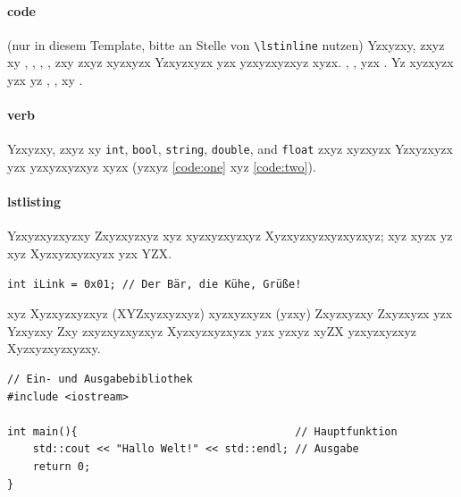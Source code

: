 \paragraph{code} (nur in diesem Template, bitte an Stelle von \verb|\lstinline| nutzen)
Yzxyzxy, zxyz xy , , , , zxy  zxyz xyzxyzx Yzxyzxyzx yzx yzxyzxyzxyz xyzx. , , yzx . Yz xyzxyzx yzx yz , 
, xy .

\paragraph{verb}
Yzxyzxy, zxyz xy \verb|int|, \verb|bool|, \verb|string|, \verb|double|, and \verb|float| zxyz xyzxyzx Yzxyzxyzx yzx yzxyzxyzxyz xyzx (yzxyz \autoref{code:one} xyz \autoref{code:two}).

\paragraph{lstlisting}
Yzxyzxyzxyzxy Zxyzxyzxyz xyz xyzxyzxyzxyz Xyzxyzxyzxyzxyzxyz; xyz xyzx yz xyz Xyzxyzxyzxyzx yzx YZX.

\begin{lstlisting}
int iLink = 0x01; // Der Bär, die Kühe, Grüße!
\end{lstlisting}

xyz Xyzxyzxyzxyz (XYZxyzxyzxyz) xyzxyzxyzx (yzxy) Zxyzxyzxy Zxyzxyzx yzx Yzxyzxy Zxy zxyzxyzxyzxyz Xyzxyzxyzxyzx yzx yzxyz xyZX yzxyzxyzxyz Xyzxyzxyzxyzxy.

\lstset{language=C++}
\begin{lstlisting}[caption={Es ist eine alte Tradition, eine neue Programmiersprache mit einem \code{Hello-World}-Programm einzuweihen. Auch dieses Buch soll mit der Tradition nicht brechen, hier ist das \code{Hello-World}-Programm in C++}, label=code:one]
// Ein- und Ausgabebibliothek
#include <iostream>

int main(){                                  // Hauptfunktion
	std::cout << "Hallo Welt!" << std::endl; // Ausgabe
	return 0;
}
\end{lstlisting}


